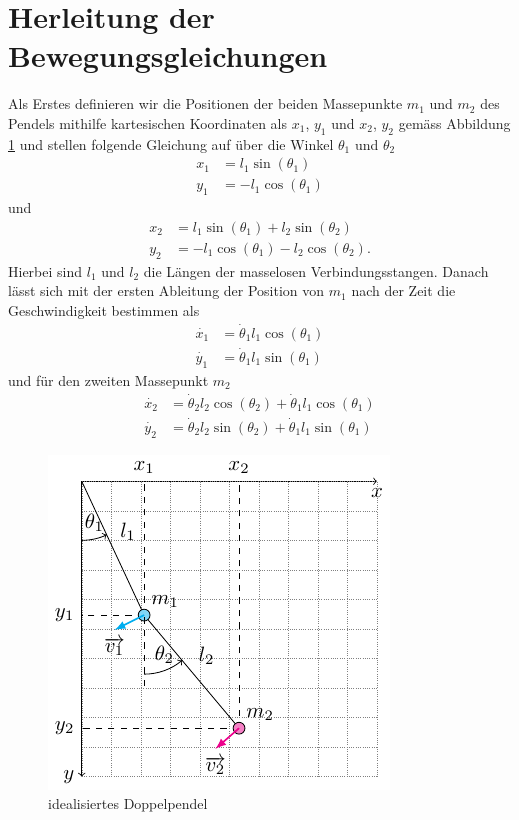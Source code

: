 
\section{Herleitung der Bewegungsgleichungen}
Als Erstes definieren wir die Positionen der beiden Massepunkte 
\(m_1\) und \(m_2\) des Pendels mithilfe kartesischen Koordinaten 
als \(x_1\), \(y_1\) und \(x_2\), \(y_2\) gemäss Abbildung \ref{fig:pendulum} 
und stellen folgende Gleichung auf über die Winkel \(\theta_1\) und \(\theta_2\)
\begin{align}
    x_1 &= l_1 \sin(\theta_1)\\
    y_1 &= -l_1 \cos(\theta_1)
\end{align}
und
\begin{align}
    x_2 &= l_1 \sin(\theta_1) + l_2 \sin(\theta_2) \\
    y_2 &= -l_1 \cos(\theta_1) - l_2 \cos(\theta_2).  
\end{align}
Hierbei sind \(l_1\) und \(l_2\) die Längen der masselosen Verbindungsstangen.
Danach lässt sich mit der ersten Ableitung der Position von
\(m_1\) nach der Zeit die Geschwindigkeit bestimmen als
\begin{align}
    \dot{x_1} &= \dot{\theta}_1 l_1 \cos(\theta_1) \\
    \dot{y_1} &= \dot{\theta}_1 l_1 \sin(\theta_1) 
\end{align}
und für den zweiten Massepunkt \(m_2\) 
\begin{align}
    \dot{x_2} &= \dot{\theta}_2 l_2 \cos(\theta_2) 
    + \dot{\theta}_1 l_1 \cos(\theta_1) \\
    \dot{y_2} &= \dot{\theta}_2 l_2 \sin(\theta_2) 
    + \dot{\theta}_1 l_1 \sin(\theta_1)
\end{align}

\begin{figure}
    \centering
    \includegraphics{images/pendel_pic.pdf}
    \caption{idealisiertes Doppelpendel}
    \label{fig:pendulum}
\end{figure}

